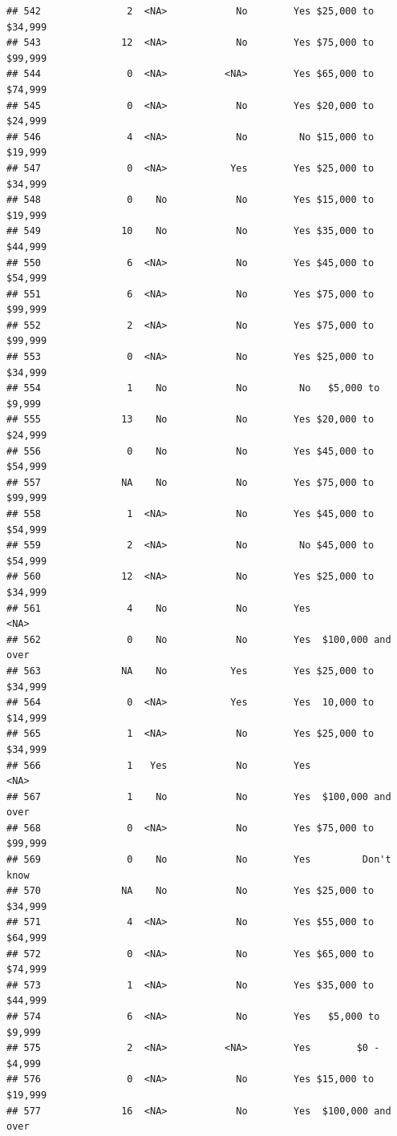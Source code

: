 \documentclass[man]{apa6}
\begin{document}
\begin{verbatim}
## 542               2  <NA>            No        Yes $25,000 to $34,999
## 543              12  <NA>            No        Yes $75,000 to $99,999
## 544               0  <NA>          <NA>        Yes $65,000 to $74,999
## 545               0  <NA>            No        Yes $20,000 to $24,999
## 546               4  <NA>            No         No $15,000 to $19,999
## 547               0  <NA>           Yes        Yes $25,000 to $34,999
## 548               0    No            No        Yes $15,000 to $19,999
## 549              10    No            No        Yes $35,000 to $44,999
## 550               6  <NA>            No        Yes $45,000 to $54,999
## 551               6  <NA>            No        Yes $75,000 to $99,999
## 552               2  <NA>            No        Yes $75,000 to $99,999
## 553               0  <NA>            No        Yes $25,000 to $34,999
## 554               1    No            No         No   $5,000 to $9,999
## 555              13    No            No        Yes $20,000 to $24,999
## 556               0    No            No        Yes $45,000 to $54,999
## 557              NA    No            No        Yes $75,000 to $99,999
## 558               1  <NA>            No        Yes $45,000 to $54,999
## 559               2  <NA>            No         No $45,000 to $54,999
## 560              12  <NA>            No        Yes $25,000 to $34,999
## 561               4    No            No        Yes               <NA>
## 562               0    No            No        Yes  $100,000 and over
## 563              NA    No           Yes        Yes $25,000 to $34,999
## 564               0  <NA>           Yes        Yes  10,000 to $14,999
## 565               1  <NA>            No        Yes $25,000 to $34,999
## 566               1   Yes            No        Yes               <NA>
## 567               1    No            No        Yes  $100,000 and over
## 568               0  <NA>            No        Yes $75,000 to $99,999
## 569               0    No            No        Yes         Don't know
## 570              NA    No            No        Yes $25,000 to $34,999
## 571               4  <NA>            No        Yes $55,000 to $64,999
## 572               0  <NA>            No        Yes $65,000 to $74,999
## 573               1  <NA>            No        Yes $35,000 to $44,999
## 574               6  <NA>            No        Yes   $5,000 to $9,999
## 575               2  <NA>          <NA>        Yes        $0 - $4,999
## 576               0  <NA>            No        Yes $15,000 to $19,999
## 577              16  <NA>            No        Yes  $100,000 and over

\end{verbatim}
\end{document}

